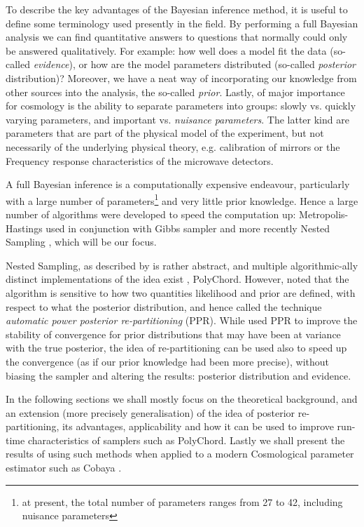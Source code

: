 \documentclass[usenatbib]{mnras}
\begin{document}
To describe the key advantages of the Bayesian inference method, it
is useful to define some terminology used presently in the field.
By performing a full Bayesian analysis we can find quantitative
answers to questions that normally could only be answered
qualitatively. For example: how well does a model fit the data
(so-called \emph{evidence}), or how are the model parameters distributed
(so-called \emph{posterior} distribution)? Moreover, we have a neat way
of incorporating our knowledge from other sources into the analysis,
the so-called \emph{prior}. Lastly, of major importance for cosmology is
the ability to separate parameters into groups: slowly vs. quickly
varying parameters, and important vs. \emph{nuisance parameters}. The
latter kind are parameters that are part of the physical model of
the experiment, but not necessarily of the underlying physical
theory, e.g. calibration of mirrors or the Frequency response
characteristics of the microwave detectors. 

A full Bayesian inference is a computationally expensive endeavour,
particularly with a large number of parameters\footnote{at present, the total number of parameters ranges from 27 to 42, including nuisance parameters} and very little
prior knowledge. Hence a large number of algorithms were developed
to speed the computation up: Metropolis-Hastings \citep{Metropolis}
used in conjunction with Gibbs sampler
\citep{Metropolis-hastings-gibbs} and more recently Nested Sampling
\citep{skilling2006}, which will be our focus.

Nested Sampling, as described by \citeauthor{skilling2006} is rather
abstract, and multiple algorithmic-ally distinct implementations of
the idea exist \citep{Feroz2009MultiNestAE}, PolyChord. However,
\cite{chen-ferroz-hobson} noted that the algorithm is sensitive to how
two quantities likelihood and prior are defined, with respect to
what the posterior distribution, and hence called the technique
\emph{automatic power posterior re-partitioning} (PPR). While
\citeauthor{chen-ferroz-hobson} used PPR to improve the stability of
convergence for prior distributions that may have been at variance
with the true posterior, the idea of re-partitioning can be used also
to speed up the convergence (as if our prior knowledge had been more
precise), without biasing the sampler and altering the results:
posterior distribution and evidence.

In the following sections we shall mostly focus on the theoretical
background, and an extension (more precisely generalisation) of the
idea of posterior re-partitioning, its advantages, applicability and
how it can be used to improve run-time characteristics of samplers
such as PolyChord. Lastly we shall present the results of using such
methods when applied to a modern Cosmological parameter estimator
such as Cobaya \citep{cobaya}.
\end{document}
